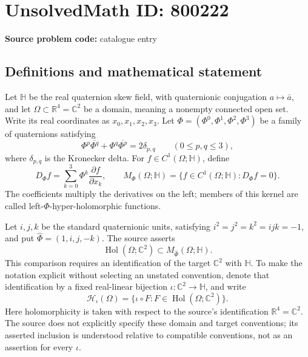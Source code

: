 \documentclass[11pt]{article}
\newcommand{\R}{\mathbb{R}}
\newcommand{\C}{\mathbb{C}}
\begin{document}
\section*{UnsolvedMath ID: 800222}
\textbf{Source problem code:} catalogue entry
\subsection{Definitions and mathematical statement}
Let \(\mathbb H\) be the real quaternion skew field, with quaternionic conjugation \(a\mapsto\bar a\), and let \(\Omega\subset\R^4=\C^2\) be a domain, meaning a nonempty connected open set. Write its real coordinates as \(x_0,x_1,x_2,x_3\). Let \(\Phi=(\Phi^0,\Phi^1,\Phi^2,\Phi^3)\) be a family of quaternions satisfying
\[
\Phi^p\overline{\Phi^q}+\Phi^q\overline{\Phi^p}=2\delta_{p,q}\qquad(0\le p,q\le3),
\]
where \(\delta_{p,q}\) is the Kronecker delta. For \(f\in C^1(\Omega;\mathbb H)\), define
\[
D_\Phi f=\sum_{k=0}^3\Phi^k\frac{\partial f}{\partial x_k},\qquad
M_\Phi(\Omega;\mathbb H)=\{f\in C^1(\Omega;\mathbb H):D_\Phi f=0\}.
\]
The coefficients multiply the derivatives on the left; members of this kernel are called left-\(\Phi\)-hyper-holomorphic functions.

Let \(i,j,k\) be the standard quaternionic units, satisfying \(i^2=j^2=k^2=ijk=-1\), and put \(\hat\Phi=(1,i,j,-k)\). The source asserts
\[
\operatorname{Hol}(\Omega;\C^2)\subset M_{\hat\Phi}(\Omega;\mathbb H).
\]
This comparison requires an identification of the target \(\C^2\) with \(\mathbb H\). To make the notation explicit without selecting an unstated convention, denote that identification by a fixed real-linear bijection \(\iota:\C^2\to\mathbb H\), and write
\[
\mathcal H_\iota(\Omega)=\{\iota\circ F:F\in\operatorname{Hol}(\Omega;\C^2)\}.
\]
Here holomorphicity is taken with respect to the source's identification \(\R^4=\C^2\). The source does not explicitly specify these domain and target conventions; its asserted inclusion is understood relative to compatible conventions, not as an assertion for every \(\iota\).
\end{document}
